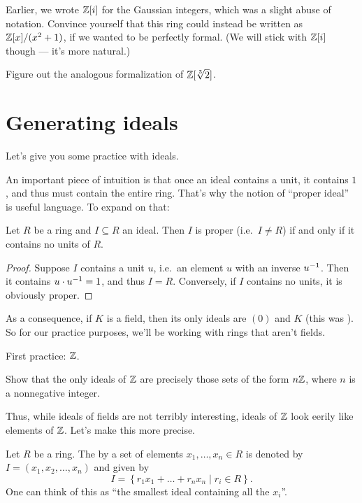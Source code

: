 \begin{exercise}
	Earlier, we wrote $\mathbb Z[i]$ for the Gaussian integers,
	which was a slight abuse of notation.
	Convince yourself that this ring
	could instead be written as $\mathbb Z[x] / (x^2+1)$,
	if we wanted to be perfectly formal.
	(We will stick with $\mathbb Z[i]$ though --- it's more natural.)

	Figure out the analogous formalization of $\mathbb Z[\sqrt[3]{2}]$.
\end{exercise}

\section{Generating ideals}

Let's give you some practice with ideals.

An important piece of intuition is that once an ideal
contains a unit, it contains $1$, and
thus must contain the entire ring.
That's why the notion of ``proper ideal''
is useful language.
To expand on that:
\begin{proposition}
	Let $R$ be a ring and $I \subseteq R$ an ideal.
	Then $I$ is proper (i.e.\ $I \neq R$)
	if and only if it contains no units of $R$.
\end{proposition}
\begin{proof}
	Suppose $I$ contains a unit $u$, i.e.\ an element $u$
	with an inverse $u^{-1}$.
	Then it contains $u \cdot u^{-1} = 1$, and thus $I = R$.
	Conversely, if $I$ contains no units, it is obviously proper.
\end{proof}
As a consequence, if $K$ is a field,
then its only ideals are $(0)$ and $K$
(this was ).
So for our practice purposes, we'll be working with rings that aren't fields.

First practice: $\mathbb Z$.
\begin{exercise}
	Show that the only ideals of $\mathbb Z$ are precisely those
	sets of the form $n\mathbb Z$, where $n$ is a nonnegative integer.
\end{exercise}

Thus, while ideals of fields are not terribly interesting,
ideals of $\mathbb Z$ look eerily like elements of $\mathbb Z$.
Let's make this more precise.
\begin{definition}
	Let $R$ be a ring.
	The  by a set of elements $x_1, \dots, x_n \in R$
	is denoted by $I = (x_1, x_2, \dots, x_n)$
	and given by
	\[ I = \left\{ r_1 x_1 + \dots + r_n x_n \mid r_i \in R \right\}.  \]
	One can think of this as ``the smallest ideal containing all the $x_i$''.
\end{definition}


